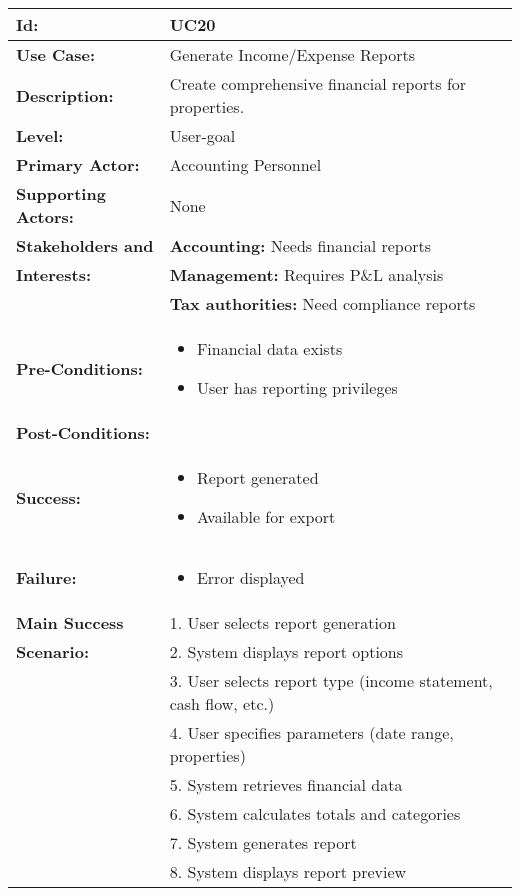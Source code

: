 \documentclass[12pt]{article}
\begin{document}
\begin{longtable}{|p{3cm}|p{11cm}|}
\hline
\textbf{Id:} & UC20 \\
\hline
\textbf{Use Case:} & Generate Income/Expense Reports \\
\hline
\textbf{Description:} & Create comprehensive financial reports for properties. \\
\hline
\textbf{Level:} & User-goal \\
\hline
\textbf{Primary Actor:} & Accounting Personnel \\
\hline
\textbf{Supporting Actors:} & None \\
\hline
\textbf{Stakeholders and} & \textbf{Accounting:} Needs financial reports \\
\textbf{Interests:} & \textbf{Management:} Requires P\&L analysis \\
& \textbf{Tax authorities:} Need compliance reports \\
\hline
\textbf{Pre-Conditions:} & 
\begin{itemize}
    \item Financial data exists
    \item User has reporting privileges
\end{itemize} \\
\hline
\textbf{Post-Conditions:} & \\
\textbf{Success:} & 
\begin{itemize}
    \item Report generated
    \item Available for export
\end{itemize} \\
\textbf{Failure:} & 
\begin{itemize}
    \item Error displayed
\end{itemize} \\
\hline
\textbf{Main Success} & 1. User selects report generation \\
\textbf{Scenario:} & 2. System displays report options \\
& 3. User selects report type (income statement, cash flow, etc.) \\
& 4. User specifies parameters (date range, properties) \\
& 5. System retrieves financial data \\
& 6. System calculates totals and categories \\
& 7. System generates report \\
& 8. System displays report preview \\

\end{longtable}
\end{document}
